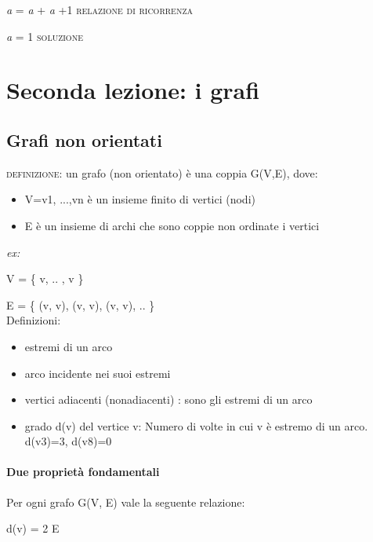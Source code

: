 \documentclass[12pt,a4paper]{article}
\begin{document}
\textit{a} = \textit{a} + \textit{a} +1 \rightarrow \textsc{relazione di ricorrenza} \par

\textit{a} = 1 \rightarrow \textsc{soluzione} \par 

\newpage



\section{Seconda lezione: i grafi}
\subsection{Grafi non orientati}
    \textsc{definizione:} un grafo (non orientato) è una coppia G(V,E), dove:
    \begin{itemize}
\item V={v1, ...,vn} è un insieme finito di vertici (nodi)
\item E è un insieme di archi che sono coppie non ordinate i vertici
    \end{itemize}

\textit{ex:} \par
V = \{ v, .. , v \} \par
E = \{ (v, v), (v, v), (v, v), .. \} \\

Definizioni:
\begin{itemize}
    \item estremi di un arco
    \item arco incidente nei suoi estremi
    \item vertici adiacenti (nonadiacenti) : sono gli estremi di un arco
    \item grado d(v) del vertice v: Numero di volte in cui v è estremo di un arco. d(v3)=3, d(v8)=0
\end{itemize}

\paragraph{Due proprietà fondamentali} \par
    Per ogni grafo G(V, E) vale la seguente relazione: \par

\begin{center}
    \sum {} d(v) = 2 \mid E \mid \\

\end{center}
\end{document}

